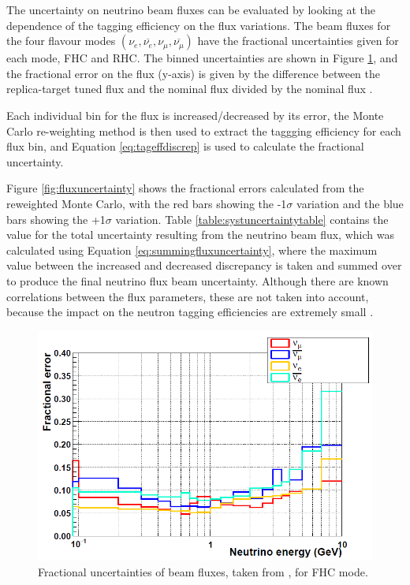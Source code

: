 The uncertainty on neutrino beam fluxes can be evaluated by looking at the dependence of the tagging efficiency on the flux variations. The beam fluxes for the four flavour modes 
$\left(\nu_{e}, \overline{\nu_{e}}, \nu_{\mu}, \overline{\nu_{\mu}}\right)$ have the fractional uncertainties given for each mode, FHC and RHC. The binned uncertainties are shown in Figure \ref{fig:frac_beam_flux_uncertainty}, and the fractional error on the flux (y-axis) is given by the difference between the replica-target tuned flux and the nominal flux divided by the nominal flux \cite{vladisavljevic_constraining_2018}.


Each individual bin for the flux is increased/decreased by its error, the Monte Carlo re-weighting method is then used to extract the taggging efficiency for each flux bin, and Equation \ref{eq:tageffdiscrep} is used to calculate the fractional uncertainty.



Figure \ref{fig:fluxuncertainty} shows the fractional errors calculated from the reweighted Monte Carlo, with the red bars showing the -1$\sigma$ variation and the blue bars showing the +1$\sigma$ variation. Table \ref{table:systuncertaintytable} contains the value for the total uncertainty resulting from the neutrino beam flux, which was calculated using Equation \ref{eq:summingfluxuncertainty}, where the maximum value between the increased and decreased discrepancy is taken and summed over to produce the final neutrino flux beam uncertainty.
Although there are known correlations between the flux parameters, these are not taken into account, because the impact on the neutron tagging efficiencies are extremely small \cite{akutsu_thesis}.
\newline

\begin{figure}[!htb]
    \includegraphics[width=\textwidth]{Figures/frac_beam_flux_uncertainty.png}
    \caption{Fractional uncertainties of beam fluxes, taken from \cite{tn415_fiacob}, for FHC mode. }
    \label{fig:frac_beam_flux_uncertainty}
\end{figure}



